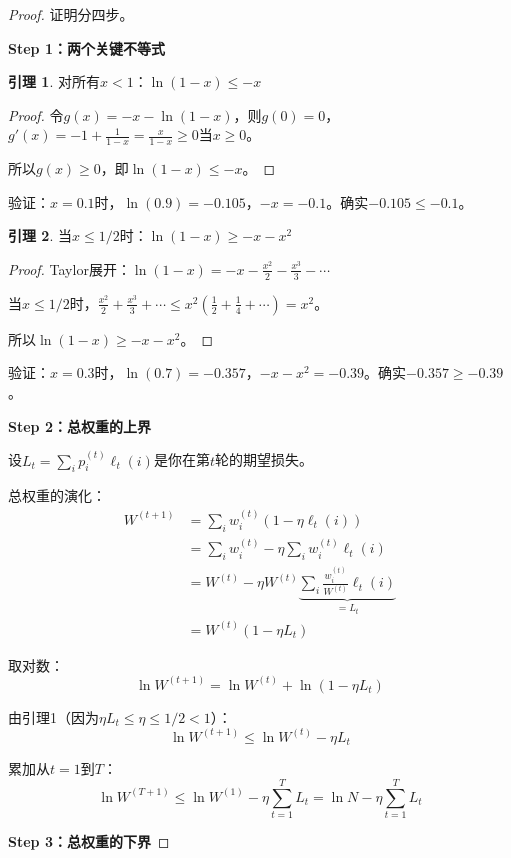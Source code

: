 \documentclass[11pt,a4paper]{article}
\theoremstyle{definition}
\newtheorem{lemma}{引理}[section]
\begin{document}
\begin{proof}
证明分四步。

\textbf{Step 1：两个关键不等式}

\begin{lemma}
对所有$x < 1$：$\ln(1-x) \leq -x$
\end{lemma}
\begin{proof}
令$g(x) = -x - \ln(1-x)$，则$g(0) = 0$，$g'(x) = -1 + \frac{1}{1-x} = \frac{x}{1-x} \geq 0$当$x \geq 0$。

所以$g(x) \geq 0$，即$\ln(1-x) \leq -x$。
\end{proof}

验证：$x = 0.1$时，$\ln(0.9) = -0.105$，$-x = -0.1$。确实$-0.105 \leq -0.1$。\checkmark

\begin{lemma}
当$x \leq 1/2$时：$\ln(1-x) \geq -x - x^2$
\end{lemma}
\begin{proof}
Taylor展开：$\ln(1-x) = -x - \frac{x^2}{2} - \frac{x^3}{3} - \cdots$

当$x \leq 1/2$时，$\frac{x^2}{2} + \frac{x^3}{3} + \cdots \leq x^2(\frac{1}{2} + \frac{1}{4} + \cdots) = x^2$。

所以$\ln(1-x) \geq -x - x^2$。
\end{proof}

验证：$x = 0.3$时，$\ln(0.7) = -0.357$，$-x - x^2 = -0.39$。确实$-0.357 \geq -0.39$。\checkmark

\textbf{Step 2：总权重的上界}

设$L_t = \sum_i p_i^{(t)} \ell_t(i)$是你在第$t$轮的期望损失。

总权重的演化：
\begin{align*}
W^{(t+1)} &= \sum_i w_i^{(t)}(1 - \eta \ell_t(i)) \\
&= \sum_i w_i^{(t)} - \eta \sum_i w_i^{(t)} \ell_t(i) \\
&= W^{(t)} - \eta W^{(t)} \underbrace{\sum_i \frac{w_i^{(t)}}{W^{(t)}} \ell_t(i)}_{= L_t} \\
&= W^{(t)} (1 - \eta L_t)
\end{align*}

取对数：
\[
\ln W^{(t+1)} = \ln W^{(t)} + \ln(1 - \eta L_t)
\]

由引理1（因为$\eta L_t \leq \eta \leq 1/2 < 1$）：
\[
\ln W^{(t+1)} \leq \ln W^{(t)} - \eta L_t
\]

累加从$t=1$到$T$：
\[
\ln W^{(T+1)} \leq \ln W^{(1)} - \eta \sum_{t=1}^T L_t = \ln N - \eta \sum_{t=1}^T L_t
\]

\textbf{Step 3：总权重的下界}


\end{proof}
\end{document}
